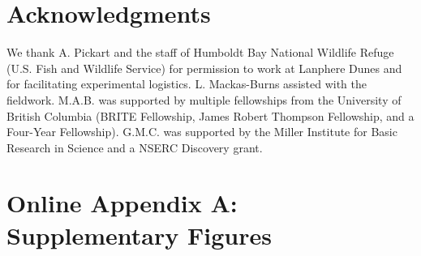 \documentclass[11pt]{article}
\begin{document}

\section*{Acknowledgments}

We thank A. Pickart and the staff of Humboldt Bay National Wildlife
Refuge (U.S. Fish and Wildlife Service) for permission to work at
Lanphere Dunes and for facilitating experimental logistics. L.
Mackas-Burns assisted with the fieldwork. M.A.B. was supported by
multiple fellowships from the University of British Columbia (BRITE
Fellowship, James Robert Thompson Fellowship, and a Four-Year
Fellowship). G.M.C. was supported by the Miller Institute for Basic
Research in Science and a NSERC Discovery grant.

\newpage{}

\renewcommand{\thesection}{\Alph{section}}

\section*{Online Appendix A: Supplementary Figures}


\renewcommand{\theequation}{A\arabic{equation}}
\renewcommand{\thetable}{A\arabic{table}}
\setcounter{equation}{0}  %
\setcounter{figure}{0}
\setcounter{table}{0}


\end{document}
